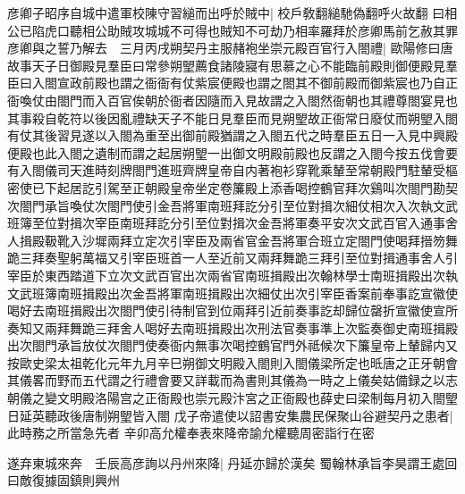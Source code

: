 彦卿子昭序自城中遣軍校陳守習縋而出呼於賊中|{
	校戶敎翻縋馳偽翻呼火故翻}
曰相公已陷虎口聽相公助賊攻城城不可得也賊知不可劫乃相率羅拜於彦卿馬前乞赦其罪彦卿與之誓乃解去　三月丙戌朔契丹主服赭袍坐崇元殿百官行入閤禮|{
	歐陽修曰唐故事天子日御殿見羣臣曰常參朔朢薦食諸陵寢有思慕之心不能臨前殿則御便殿見羣臣曰入閤宣政前殿也謂之衙衙有仗紫宸便殿也謂之閤其不御前殿而御紫宸也乃自正衙喚仗由閤門而入百官俟朝於衙者因隨而入見故謂之入閤然衙朝也其禮尊閤宴見也其事殺自乾符以後因亂禮缺天子不能日見羣臣而見朔朢故正衙常日廢仗而朔朢入閤有仗其後習見遂以入閤為重至出御前殿猶謂之入閤五代之時羣臣五日一入見中興殿便殿也此入閤之遺制而謂之起居朔朢一出御文明殿前殿也反謂之入閤今按五伐會要有入閤儀司天進時刻牌閤門進班齊牌皇帝自内著袍衫穿靴乘輦至常朝殿門駐輦受樞密使已下起居訖引駕至正朝殿皇帝坐定卷簾殿上添香喝控鶴官拜次鷄叫次閤門勘契次閤門承旨喚仗次閤門使引金吾將軍南班拜訖分引至位對揖次細仗相次入次執文武班簿至位對揖次宰臣南班拜訖分引至位對揖次金吾將軍奏平安次文武百官入通事舍人揖殿靸靴入沙墀兩拜立定次引宰臣及兩省官金吾將軍合班立定閤門使喝拜搢笏舞跪三拜奏聖躬萬福又引宰臣班首一人至近前又兩拜舞跪三拜引至位對揖通事舍人引宰臣於東西踏道下立次文武百官出次兩省官南班揖殿出次翰林學士南班揖殿出次執文武班簿南班揖殿出次金吾將軍南班揖殿出次細仗出次引宰臣香案前奉事訖宣徽使喝好去南班揖殿出次閤門使引待制官到位兩拜引近前奏事訖却歸位罄折宣徽使宣所奏知又兩拜舞跪三拜舍人喝好去南班揖殿出次刑法官奏事準上次監奏御史南班揖殿出次閤門承旨放仗次閤門使奏衙内無事次喝控鶴官門外祗候次下簾皇帝上輦歸内又按歐史梁太祖乾化元年九月辛巳朔御文明殿入閤則入閤儀梁所定也㫝唐之正牙朝會其儀畧而野而五代謂之行禮會要又詳載而為書則其儀為一時之上儀矣姑備録之以志朝儀之變文明殿洛陽宫之正衙殿也崇元殿汴宮之正衙殿也薛史曰梁制每月初入閤朢日延英聽政後唐制朔朢皆入閤}
戊子帝遣使以詔書安集農民保聚山谷避契丹之患者|{
	此時務之所當急先者}
辛卯高允權奉表來降帝諭允權聽周密詣行在密

遂弃東城來奔　壬辰高彦詢以丹州來降|{
	丹延亦歸於漢矣}
蜀翰林承旨李昊謂王處回曰敵復據固鎮則興州

